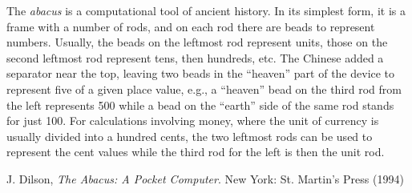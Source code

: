 \documentclass[12pt]{article}
\begin{document}

The {\em abacus} is a computational tool of ancient history. In its simplest form, it is a frame with a number of rods, and on each rod there are beads to represent numbers. Usually, the beads on the leftmost rod represent units, those on the second leftmost rod represent tens, then hundreds, etc. The Chinese added a separator near the top, leaving two beads in the ``heaven'' part of the device to represent five of a given place value, e.g., a ``heaven'' bead on the third rod from the left represents 500 while a bead on the ``earth'' side of the same rod stands for just 100. For calculations involving money, where the unit of currency is usually divided into a hundred cents, the two leftmost rods can be used to represent the cent values while the third rod for the left is then the unit rod.

\begin{thebibliography}{1}
 J. Dilson, {\it The Abacus: A Pocket Computer}. New York: St. Martin's Press (1994)
\end{thebibliography}

\end{document}
